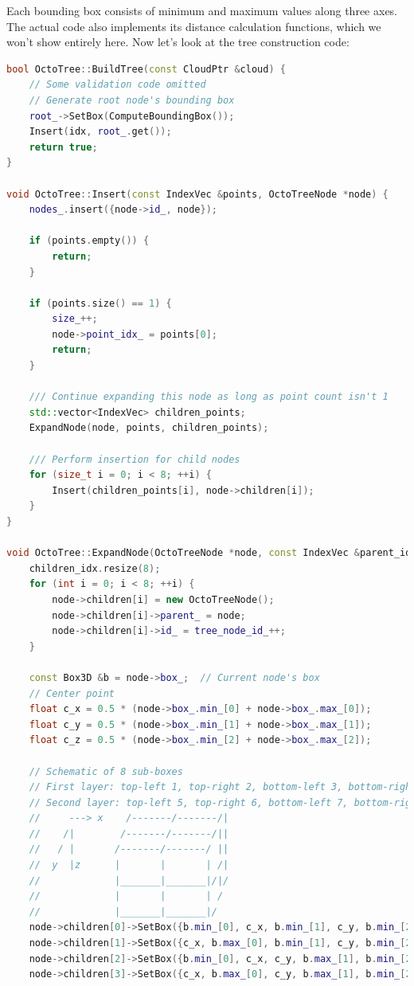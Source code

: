 Each bounding box consists of minimum and maximum values along three axes. The actual code also implements its distance calculation functions, which we won't show entirely here. Now let's look at the tree construction code:

\begin{lstlisting}[language=c++,caption=src/ch5/octo\_tree.cc]
bool OctoTree::BuildTree(const CloudPtr &cloud) {
	// Some validation code omitted	
	// Generate root node's bounding box
	root_->SetBox(ComputeBoundingBox());
	Insert(idx, root_.get());
	return true;
}

void OctoTree::Insert(const IndexVec &points, OctoTreeNode *node) {
	nodes_.insert({node->id_, node});
	
	if (points.empty()) {
		return;
	}
	
	if (points.size() == 1) {
		size_++;
		node->point_idx_ = points[0];
		return;
	}
	
	/// Continue expanding this node as long as point count isn't 1
	std::vector<IndexVec> children_points;
	ExpandNode(node, points, children_points);
	
	/// Perform insertion for child nodes
	for (size_t i = 0; i < 8; ++i) {
		Insert(children_points[i], node->children[i]);
	}
}

void OctoTree::ExpandNode(OctoTreeNode *node, const IndexVec &parent_idx, std::vector<IndexVec> &children_idx) {
	children_idx.resize(8);
	for (int i = 0; i < 8; ++i) {
		node->children[i] = new OctoTreeNode();
		node->children[i]->parent_ = node;
		node->children[i]->id_ = tree_node_id_++;
	}
	
	const Box3D &b = node->box_;  // Current node's box
	// Center point
	float c_x = 0.5 * (node->box_.min_[0] + node->box_.max_[0]);
	float c_y = 0.5 * (node->box_.min_[1] + node->box_.max_[1]);
	float c_z = 0.5 * (node->box_.min_[2] + node->box_.max_[2]);
	
	// Schematic of 8 sub-boxes
	// First layer: top-left 1, top-right 2, bottom-left 3, bottom-right 4
	// Second layer: top-left 5, top-right 6, bottom-left 7, bottom-right 8
	//     ---> x    /-------/-------/|
	//    /|        /-------/-------/||
	//   / |       /-------/-------/ ||
	//  y  |z      |       |       | /|
	//             |_______|_______|/|/
	//             |       |       | /
	//             |_______|_______|/
	node->children[0]->SetBox({b.min_[0], c_x, b.min_[1], c_y, b.min_[2], c_z});
	node->children[1]->SetBox({c_x, b.max_[0], b.min_[1], c_y, b.min_[2], c_z});
	node->children[2]->SetBox({b.min_[0], c_x, c_y, b.max_[1], b.min_[2], c_z});
	node->children[3]->SetBox({c_x, b.max_[0], c_y, b.max_[1], b.min_[2], c_z});
	

\end{lstlisting}
